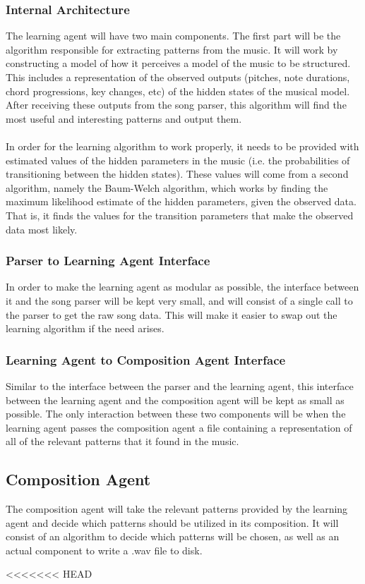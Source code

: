 \documentclass{article}
\begin{document}
\subsubsection{Internal Architecture}
The learning agent will have two main components. The first part will be the algorithm responsible for extracting patterns from the music. It will work by constructing a model of how it perceives a model of the music to be structured. This includes a representation of the observed outputs (pitches, note durations, chord progressions, key changes, etc) of the hidden states of the musical model. After receiving these outputs from the song parser, this algorithm will find the most useful and interesting patterns and output them.\\
\\
In order for the learning algorithm to work properly, it needs to be provided with estimated values of the hidden parameters in the music (i.e. the probabilities of transitioning between the hidden states). These values will come from a second algorithm, namely the Baum-Welch algorithm, which works by finding the maximum likelihood estimate of the hidden parameters, given the observed data. That is, it finds the values for the transition parameters that make the observed data most likely. 

\subsubsection{Parser to Learning Agent Interface}
In order to make the learning agent as modular as possible, the interface between it and the song parser will be kept very small, and will consist of a single call to the parser to get the raw song data. This will make it easier to swap out the learning algorithm if the need arises.

\subsubsection{Learning Agent to Composition Agent Interface}
Similar to the interface between the parser and the learning agent, this interface between the learning agent and the composition agent will be kept as small as possible. The only interaction between these two components will be when the learning agent passes the composition agent a file containing a representation of all of the relevant patterns that it found in the music.

\subsection{Composition Agent}
The composition agent will take the relevant patterns provided by the learning agent and decide which patterns should be utilized in its composition.  It will consist of an algorithm to decide which patterns will be chosen, as well as an actual component to write a .wav file to disk.

\nocite{*}






<<<<<<< HEAD
\end{document}
